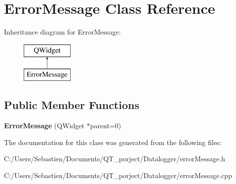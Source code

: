 \hypertarget{class_error_message}{}\section{Error\+Message Class Reference}
\label{class_error_message}
Inheritance diagram for Error\+Message\+:\begin{figure}[H]
\begin{center}
\leavevmode
\includegraphics[height=2.000000cm]{class_error_message}
\end{center}
\end{figure}
\subsection*{Public Member Functions}
\begin{DoxyCompactItemize}
\item 
\mbox{\label{class_error_message_ad84a0706d3bc0e5495480f19c6c72f8f}} 
{\bfseries Error\+Message} (Q\+Widget $\ast$parent=0)
\end{DoxyCompactItemize}


The documentation for this class was generated from the following files\+:\begin{DoxyCompactItemize}
\item 
C\+:/\+Users/\+Sebastien/\+Documents/\+Q\+T\+\_\+porject/\+Datalogger/error\+Message.\+h\item 
C\+:/\+Users/\+Sebastien/\+Documents/\+Q\+T\+\_\+porject/\+Datalogger/error\+Message.\+cpp\end{DoxyCompactItemize}
